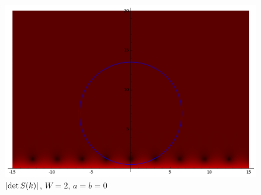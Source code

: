 \documentclass{beamer}
\begin{document}









\begin{frame}[plain]
\begin{figure}
\includegraphics[width=\textwidth,height=\textheight,keepaspectratio]{pic/contour.png}
\caption{$\abs{\det S(k)}$, $W = 2$, $a = b = 0$}
\end{figure}
\end{frame}
\end{document}
